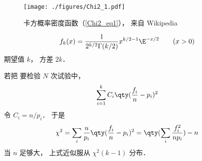 
\begin{issues}
\issueDraft
\end{issues}

\begin{figure}[ht]
\centering
\texttt{[image: ./figures/Chi2\_1.pdf]}
\caption{卡方概率密度函数（\autoref{Chi2_eq1}）， 来自 Wikipedia} \label{Chi2_fig1}
\end{figure}

\begin{equation}\label{Chi2_eq1}
f_k(x) = \frac{1}{2^{k/2}\Gamma(k/2)}x^{k/2-1}\E^{-x/2} \qquad (x > 0)
\end{equation}
期望值 $k$， 方差 $2k$．


若把 要检验 $N$ 次试验中， 
\begin{equation}
\sum_{i=1}^k C_i \qty(\frac{f_i}{n} - p_i)^2
\end{equation}
令 $C_i = n/p_i$． 于是
\begin{equation}
\chi^2 = \sum_i \frac{n}{p_i} \qty(\frac{f_i}{n} - p_i)^2 = \qty(\sum_i \frac{f_i^2}{np_i}) - n
\end{equation}
当 $n$ 足够大， 上式近似服从 $\chi^2(k-1)$ 分布．


